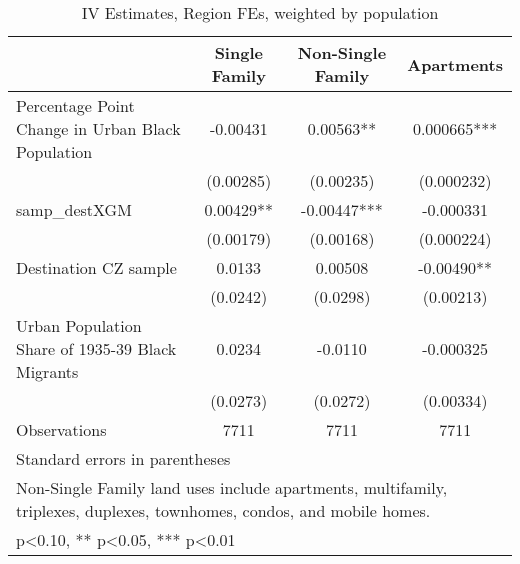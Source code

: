 \begin{table}[htbp]\centering
\def\sym#1{\ifmmode^{#1}\else\(^{#1}\)\fi}
\caption{IV Estimates, Region FEs, weighted by population}
\begin{tabular}{l*{3}{c}}
\toprule
                    &\multicolumn{1}{c}{Single Family}&\multicolumn{1}{c}{Non-Single Family}&\multicolumn{1}{c}{Apartments}\\
\midrule
Percentage Point Change in Urban Black Population&    -0.00431   &     0.00563** &    0.000665***\\
                    &   (0.00285)   &   (0.00235)   &  (0.000232)   \\
\addlinespace
samp\_destXGM        &     0.00429** &    -0.00447***&   -0.000331   \\
                    &   (0.00179)   &   (0.00168)   &  (0.000224)   \\
\addlinespace
Destination CZ sample&      0.0133   &     0.00508   &    -0.00490** \\
                    &    (0.0242)   &    (0.0298)   &   (0.00213)   \\
\addlinespace
Urban Population Share of 1935-39 Black Migrants&      0.0234   &     -0.0110   &   -0.000325   \\
                    &    (0.0273)   &    (0.0272)   &   (0.00334)   \\
\midrule
Observations        &        7711   &        7711   &        7711   \\
\bottomrule
\multicolumn{4}{l}{\footnotesize Standard errors in parentheses}\\
\multicolumn{4}{l}{\footnotesize Non-Single Family land uses include apartments, multifamily, triplexes, duplexes, townhomes, condos, and mobile homes.}\\
\multicolumn{4}{l}{\footnotesize * p<0.10, ** p<0.05, *** p<0.01}\\
\end{tabular}
\end{table}
